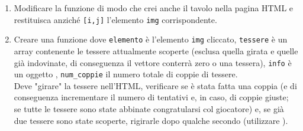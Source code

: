 \begin{frame}\transfade
  \begin{exercise}\centering
    \begin{enumerate}
      \item Modificare la funzione  di modo che crei anche il tavolo nella pagina HTML e restituisca anziché \texttt{[i,j]} l'elemento \texttt{img} corrispondente.
      \item Creare una funzione  dove \texttt{elemento} è l'elemento \texttt{img} cliccato, \texttt{tessere} è un array contenente le tessere attualmente scoperte (esclusa quella girata e quelle già indovinate, di conseguenza il vettore conterrà zero o una tessera), \texttt{info} è un oggetto , \texttt{num\_coppie} il numero totale di coppie di tessere.\\
      Deve "girare" la tessere nell'HTML, verificare se è stata fatta una coppia (e di conseguenza incrementare il numero di tentativi e, in caso, di coppie giuste; se tutte le tessere sono state abbinate congratularsi col giocatore) e, se già due tessere sono state scoperte, rigirarle dopo qualche secondo (utilizzare ).
    \end{enumerate}
  \end{exercise}
\end{frame}

